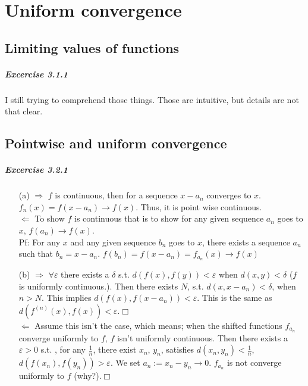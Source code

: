 \chapter{Uniform convergence}
\section{Limiting values of functions}
\paragraph{Excercise 3.1.1}
I still trying to comprehend those things. Those are intuitive, but details are not that clear.
\section{Pointwise and uniform convergence}
\paragraph{Excercise 3.2.1}
\begin{itemize}
\item[(a)]$\Rightarrow$ $f$ is continuous, then for a sequence $x-a_{n}$ converges to $x$. $f_{n}(x)=f(x-a_{n})\rightarrow f(x)$. Thus, it is point wise continuous.\\
$\Leftarrow$ To show $f$ is continuous that is to show for any given sequence $a_{n}$ goes to $x$, $f(a_{n})\rightarrow f(x)$.\\ Pf: For any $x$ and any given sequence $b_{n}$ goes to $x$, there exists a sequence $a_{n}$ such that $b_{n}=x-a_{n}$. $f(b_{n})=f(x-a_{n})=f_{a_{n}}(x)\rightarrow f(x)$\\
\item[(b)]$\Rightarrow$ $\forall\varepsilon$ there exists a $\delta$ s.t. $d(f(x),f(y))<\varepsilon$ when $d(x,y)<\delta$  ($f$ is uniformly continuous.). Then there exists $N$, s.t. $d(x,x-a_{n})<\delta$, when $n>N$. This implies $d(f(x),f(x-a_{n}))<\varepsilon$. This is the same as $d(f^{(n)}(x),f(x))<\varepsilon$.$\Box$\\
$\Leftarrow$ Assume this isn't the case, which means; when the shifted functions $f_{a_{n}}$ converge uniformly to $f$, $f$ isn't uniformly continuous. Then there exists a $\varepsilon>0$ s.t. , for any $\frac{1}{n}$, there exist $x_{n}$, $y_{n}$, satisfies $d(x_{n},y_{n})<\frac{1}{n}$, $d(f(x_{n}),f(y_{n}))>\varepsilon$. We set $a_{n}:=x_{n}-y_{n}\rightarrow 0$. $f_{a_{n}}$ is not converge uniformly to $f$ (why?).\Lightning$\Box$\\

\end{itemize}


